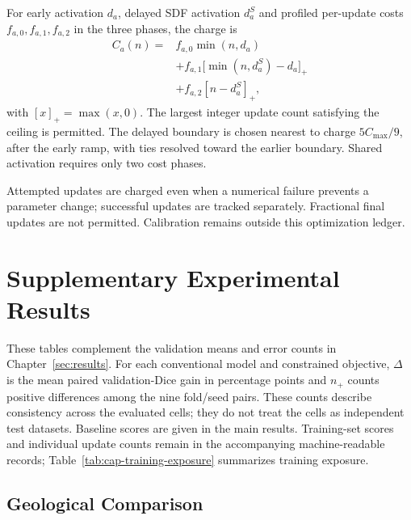 \documentclass[12pt,a4paper]{article}
\begin{document}
For early activation $d_a$, delayed SDF activation $d_a^S$ and
profiled per-update costs $f_{a,0},f_{a,1},f_{a,2}$ in the three
phases, the charge is
\begin{equation}
\begin{aligned}
C_a(n)={}&f_{a,0}\min(n,d_a)\\
 &+f_{a,1}\bigl[\min(n,d_a^S)-d_a\bigr]_+\\
 &+f_{a,2}[n-d_a^S]_+,
\end{aligned}
\label{eq:piecewise-optimization-cost}
\end{equation}
with $[x]_+=\max(x,0)$. The largest integer update count satisfying
the ceiling is permitted. The delayed boundary is chosen nearest
to charge $5C_{\max}/9$, after the early ramp, with ties resolved
toward the earlier boundary. Shared activation requires only two
cost phases.

Attempted updates are charged even when a numerical failure prevents
a parameter change; successful updates are tracked separately.
Fractional final updates are not permitted. Calibration remains
outside this optimization ledger.

\clearpage

\section{Supplementary Experimental Results}
\label{sec:extended-results}

These tables complement the validation means and error counts in
Chapter~\ref{sec:results}. For each conventional model and constrained
objective, $\Delta$ is the mean paired validation-Dice gain in percentage
points and $n_+$ counts positive differences among the nine fold/seed
pairs. These counts describe consistency across the evaluated cells;
they do not treat the cells as independent test datasets. Baseline
scores are given in the main results. Training-set scores and individual
update counts remain in the accompanying machine-readable records;
Table~\ref{tab:cap-training-exposure} summarizes training exposure.

\subsection{Geological Comparison}
\end{document}
